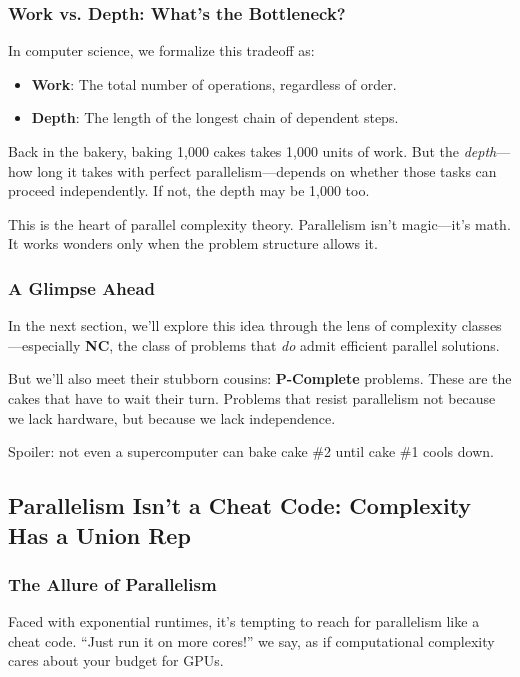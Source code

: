 \subsubsection{Work vs. Depth: What's the Bottleneck?}

In computer science, we formalize this tradeoff as:

\begin{itemize}
  \item \textbf{Work}: The total number of operations, regardless of order.
  \item \textbf{Depth}: The length of the longest chain of dependent steps.
\end{itemize}

Back in the bakery, baking 1,000 cakes takes 1,000 units of work. But the \textit{depth}—how long it takes with perfect parallelism—depends on whether those tasks can proceed independently. If not, the depth may be 1,000 too.

This is the heart of parallel complexity theory. Parallelism isn’t magic—it’s math. It works wonders only when the problem structure allows it.

\subsubsection{A Glimpse Ahead}

In the next section, we’ll explore this idea through the lens of complexity classes—especially \textbf{NC}, the class of problems that \textit{do} admit efficient parallel solutions.

But we’ll also meet their stubborn cousins: \textbf{P-Complete} problems. These are the cakes that have to wait their turn. Problems that resist parallelism not because we lack hardware, but because we lack independence.

Spoiler: not even a supercomputer can bake cake \#2 until cake \#1 cools down.




\subsection{Parallelism Isn’t a Cheat Code: Complexity Has a Union Rep}

\subsubsection{The Allure of Parallelism}

Faced with exponential runtimes, it's tempting to reach for parallelism like a cheat code. “Just run it on more cores!” we say, as if computational complexity cares about your budget for GPUs.

